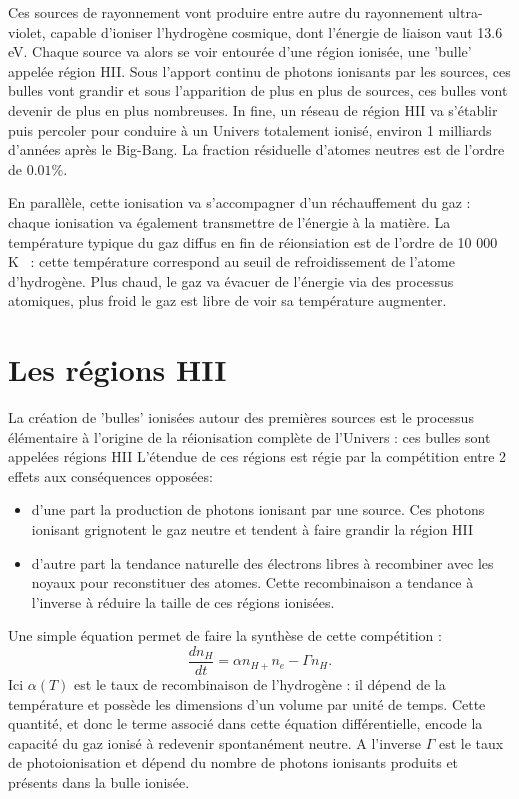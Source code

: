 Ces sources de rayonnement vont produire entre autre du rayonnement ultra-violet, capable d'ioniser l'hydrogène cosmique, dont l'énergie de liaison vaut 13.6 eV. Chaque source va alors se voir entourée d'une région ionisée, une 'bulle' appelée région HII. Sous l'apport continu de photons ionisants par les sources, ces bulles vont grandir et sous l'apparition de plus en plus de sources, ces bulles vont devenir de plus en plus nombreuses. In fine, un réseau de région HII va s'établir puis percoler pour conduire à un Univers totalement ionisé, environ 1 milliards d'années après le Big-Bang. La fraction résiduelle d'atomes neutres est de l'ordre de $0.01\%$.

En parallèle, cette ionisation va s'accompagner d'un réchauffement du gaz : chaque ionisation va également transmettre de l'énergie à la matière. La température typique du gaz diffus en fin de réionsiation est de l'ordre de 10 000 K ~: cette température correspond au seuil de refroidissement de l'atome d'hydrogène. Plus chaud, le gaz va évacuer de l'énergie via des processus atomiques, plus froid le gaz est libre de voir sa température augmenter.

\section{Les régions HII}
La création de 'bulles' ionisées autour des premières sources est le processus élémentaire à l'origine de la réionisation complète de l'Univers : ces bulles sont appelées régions HII L'étendue de ces régions est régie par la compétition entre 2 effets aux conséquences opposées:
\begin{itemize}
\item d'une part la production de photons ionisant par une source. Ces photons ionisant grignotent le gaz neutre et tendent à faire grandir la région HII
\item d'autre part la tendance naturelle des électrons libres à recombiner avec les noyaux pour reconstituer des atomes. Cette recombinaison a tendance à l'inverse à réduire la taille de ces régions ionisées.
\end{itemize}
Une simple équation permet de faire la synthèse de cette compétition :
\begin{equation}
\frac{d n_H}{dt}=\alpha n_{H+}n_e -\Gamma n_H.
\end{equation}
Ici $\alpha(T)$ est le taux de recombinaison de l'hydrogène : il dépend de la température et possède les dimensions d'un volume par unité de temps. Cette quantité, et donc le terme associé dans cette équation différentielle, encode la capacité du gaz ionisé à redevenir spontanément neutre.  A l'inverse $\Gamma$ est le taux de photoionisation et dépend du nombre de photons ionisants produits et présents dans la bulle ionisée.

